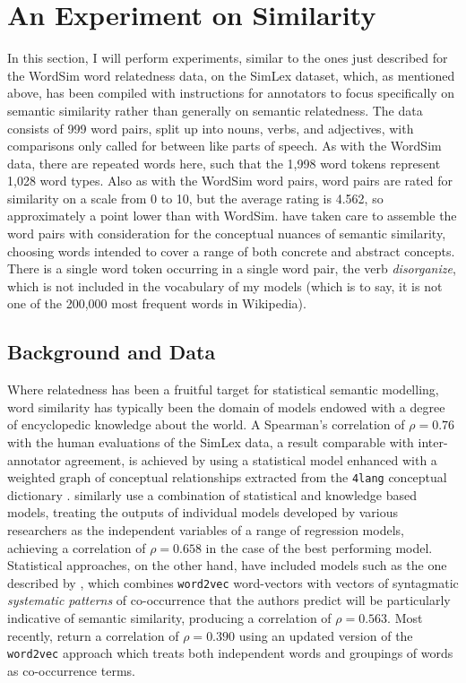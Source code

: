 \section{An Experiment on Similarity} \label{sec:simperiment}
In this section, I will perform experiments, similar to the ones just described for the WordSim word relatedness data, on the SimLex dataset, which, as mentioned above, has been compiled with instructions for annotators to focus specifically on semantic similarity rather than generally on semantic relatedness.  The data consists of 999 word pairs, split up into nouns, verbs, and adjectives, with comparisons only called for between like parts of speech.  As with the WordSim data, there are repeated words here, such that the 1,998 word tokens represent 1,028 word types.  Also as with the WordSim word pairs, word pairs are rated for similarity on a scale from 0 to 10, but the average rating is 4.562, so approximately a point lower than with WordSim.  \cite{HillEA2015} have taken care to assemble the word pairs with consideration for the conceptual nuances of semantic similarity, choosing words intended to cover a range of both concrete and abstract concepts.  There is a single word token occurring in a single word pair, the verb \emph{disorganize}, which is not included in the vocabulary of my models (which is to say, it is not one of the 200,000 most frequent words in Wikipedia).

\subsection{Background and Data}
Where relatedness has been a fruitful target for statistical semantic modelling, word similarity has typically been the domain of models endowed with a degree of encyclopedic knowledge about the world.  A Spearman's correlation of $\rho = 0.76$ with the human evaluations of the SimLex data, a result comparable with inter-annotator agreement, is achieved by \cite{RecskiEA2016} using a statistical model enhanced with a weighted graph of conceptual relationships extracted from the \texttt{4lang} conceptual dictionary \citep{KornaiEA2015}.  \cite{BanjadeEA2015} similarly use a combination of statistical and knowledge based models, treating the outputs of individual models developed by various researchers as the independent variables of a range of regression models, achieving a correlation of $\rho = 0.658$ in the case of the best performing model.  Statistical approaches, on the other hand, have included models such as the one described by \cite{SchwartzEA2015}, which combines \texttt{word2vec} word-vectors with vectors of syntagmatic \emph{systematic patterns} of co-occurrence that the authors predict will be particularly indicative of semantic similarity, producing a correlation of $\rho = 0.563$.  Most recently, \cite{MaEA2017} return a correlation of $\rho = 0.390$ using an updated version of the \texttt{word2vec} approach which treats both independent words and groupings of words as co-occurrence terms.

